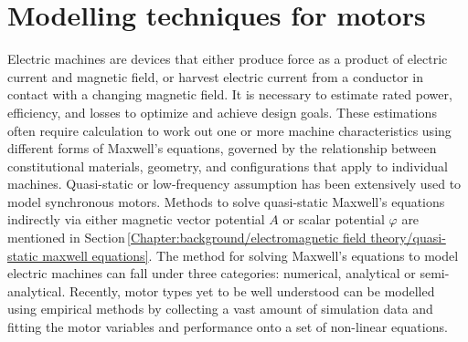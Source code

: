         

\section{Modelling techniques for motors}           \label{Chapter:background/modelling techniques for designing motors}


    Electric machines are devices that either produce force as a product of electric current and magnetic field, or harvest electric current from a conductor in contact with a changing magnetic field. It is necessary to estimate rated power, efficiency, and losses to optimize and achieve design goals. These estimations often require calculation to work out one or more machine characteristics using different forms of Maxwell's equations, governed by the relationship between constitutional materials, geometry, and configurations that apply to individual machines. Quasi-static or low-frequency assumption has been extensively used to model synchronous motors. Methods to solve quasi-static Maxwell's equations indirectly via either magnetic vector potential $A$ or scalar potential $\varphi$ are mentioned in Section\,\ref{Chapter:background/electromagnetic field theory/quasi-static maxwell equations}. The method for solving Maxwell's equations to model electric machines can fall under three categories: numerical, analytical or semi-analytical. Recently, motor types yet to be well understood can be modelled using empirical methods by collecting a vast amount of simulation data and fitting the motor variables and performance onto a set of non-linear equations.


